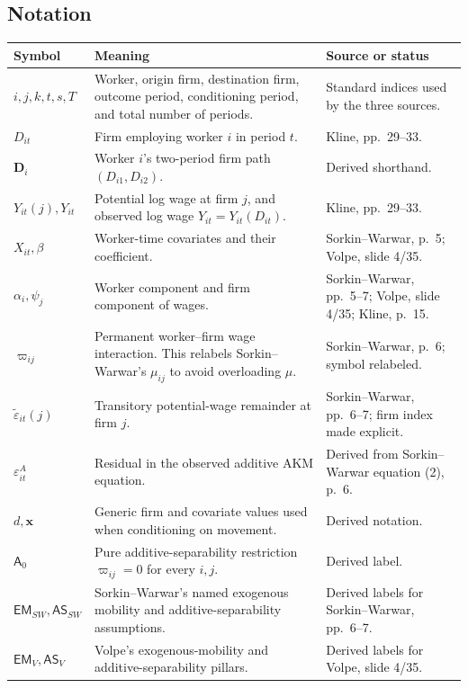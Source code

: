 \documentclass[11pt]{article}
\begin{document}
\subsection{Notation}

\begin{longtable}{p{}p{}p{}}
\textbf{Symbol} & \textbf{Meaning} & \textbf{Source or status} \\
\hline
\(i,j,k,t,s,T\) & Worker, origin firm, destination firm, outcome period,
conditioning period, and total number of periods. & Standard indices used
by the three sources. \\
\(D_{it}\) & Firm employing worker \(i\) in period \(t\). & Kline,
pp.\ 29--33. \\
\(\mathbf D_i\) & Worker \(i\)'s two-period firm path
\((D_{i1},D_{i2})\). & Derived shorthand. \\
\(Y_{it}(j),Y_{it}\) & Potential log wage at firm \(j\), and observed log
wage \(Y_{it}=Y_{it}(D_{it})\). & Kline, pp.\ 29--33. \\
\(X_{it},\beta\) & Worker-time covariates and their coefficient. &
Sorkin--Warwar, p.\ 5; Volpe, slide 4/35. \\
\(\alpha_i,\psi_j\) & Worker component and firm component of wages. &
Sorkin--Warwar, pp.\ 5--7; Volpe, slide 4/35; Kline, p.\ 15. \\
\(\varpi_{ij}\) & Permanent worker--firm wage interaction.  This relabels
Sorkin--Warwar's \(\mu_{ij}\) to avoid overloading \(\mu\). &
Sorkin--Warwar, p.\ 6; symbol relabeled. \\
\(\widetilde\varepsilon_{it}(j)\) & Transitory potential-wage remainder at
firm \(j\). & Sorkin--Warwar, pp.\ 6--7; firm index made explicit. \\
\(\varepsilon^A_{it}\) & Residual in the observed additive AKM equation. &
Derived from Sorkin--Warwar equation (2), p.\ 6. \\
\(d,\mathbf x\) & Generic firm and covariate values used when conditioning
on movement. & Derived notation. \\
\(\mathsf A_0\) & Pure additive-separability restriction
\(\varpi_{ij}=0\) for every \(i,j\). & Derived label. \\
\(\mathsf{EM}_{SW},\mathsf{AS}_{SW}\) & Sorkin--Warwar's named exogenous
mobility and additive-separability assumptions. & Derived labels for
Sorkin--Warwar, pp.\ 6--7. \\
\(\mathsf{EM}_{V},\mathsf{AS}_{V}\) & Volpe's exogenous-mobility and
additive-separability pillars. & Derived labels for Volpe, slide 4/35. \\

\end{longtable}
\end{document}
